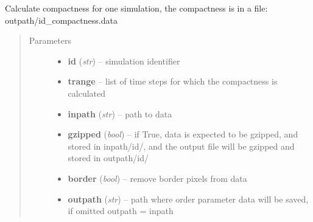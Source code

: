 \documentclass[letterpaper,10pt,english]{sphinxmanual}
\begin{document}

\begin{fulllineitems}
\label{CC3DPipeline:CC3DPipeline.getCompactnessForSim}
Calculate compactness for one simulation, the compactness is in a file: outpath/id\_compactness.data
\begin{quote}\begin{description}
\item[{Parameters}] \leavevmode\begin{itemize}
\item {} 
\textbf{id} (\emph{str}) -- simulation identifier

\item {} 
\textbf{trange} -- list of time steps for which the compactness is calculated

\item {} 
\textbf{inpath} (\emph{str}) -- path to data

\item {} 
\textbf{gzipped} (\emph{bool}) -- if True, data is expected to be gzipped, and stored in inpath/id/, and the output file will be gzipped and stored in outpath/id/

\item {} 
\textbf{border} (\emph{bool}) -- remove border pixels from data

\item {} 
\textbf{outpath} (\emph{str}) -- path where order parameter data will be saved, if omitted outpath = inpath

\end{itemize}

\end{description}\end{quote}




{\hyperref[AnalysisUtils:AnalysisUtils.getCompactness]{}}



\end{fulllineitems}

\end{document}
